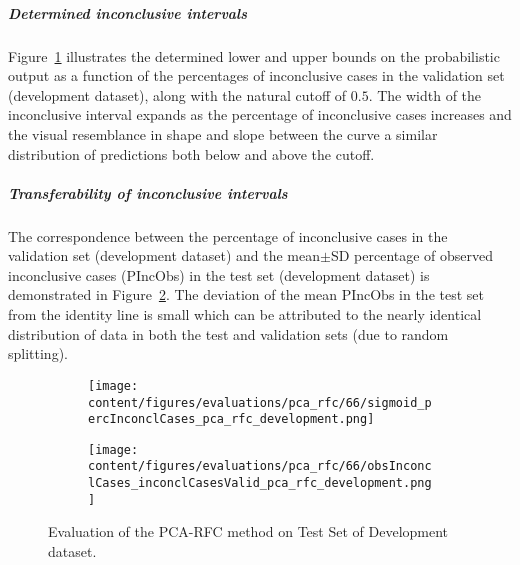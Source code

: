 \subparagraph{Determined inconclusive intervals}

Figure~\ref{fig:pca_rfc_percInconclCases_development} illustrates the determined lower and upper bounds on the 
probabilistic output as a function of the percentages of inconclusive cases in the validation set (development dataset), 
along with the natural cutoff of $0.5$.
The width of the inconclusive interval expands as the percentage of inconclusive cases increases 
and the visual resemblance in shape and slope between the curve a similar distribution of predictions both below and above the cutoff.

\subparagraph{Transferability of inconclusive intervals}

The correspondence between the percentage of inconclusive cases in the validation set (development dataset) and 
the mean$\pm$SD percentage of observed inconclusive cases (PIncObs) in the test set (development dataset) 
is demonstrated in Figure~\ref{fig:obsInconclCases_inconclCasesValid_pca_rfc_development}.
The deviation of the mean PIncObs in the test set from the 
identity line is small which can be attributed to the nearly identical distribution of data in both the test and validation sets 
(due to random splitting).


\begin{figure}[ht]
  \begin{subfigure}{0.48\textwidth}
    \centering
    \texttt{[image: content/figures/evaluations/pca\_rfc/66/sigmoid\_percInconclCases\_pca\_rfc\_development.png]}
    \label{fig:pca_rfc_percInconclCases_development}
  \end{subfigure}
  \hfill
  \begin{subfigure}{0.495\textwidth}
    \centering
    \texttt{[image: content/figures/evaluations/pca\_rfc/66/obsInconclCases\_inconclCasesValid\_pca\_rfc\_development.png]}
    \label{fig:obsInconclCases_inconclCasesValid_pca_rfc_development}
  \end{subfigure}

  \caption{Evaluation of the PCA-RFC method on Test Set of Development dataset.}
  \label{fig:pca_rfc_dev_fig}
\end{figure}


